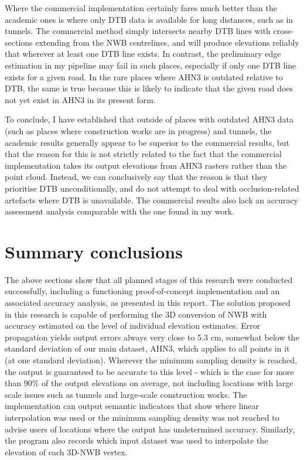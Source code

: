 Where the commercial implementation certainly fares much better than the academic ones is where only DTB data is available for long distances, such as in tunnels. The commercial method simply intersects nearby DTB lines with cross-sections extending from the NWB centrelines, and will produce elevations reliably that wherever at least one DTB line exists. In contrast, the preliminary edge estimation in my pipeline may fail in such places, especially if only one DTB line exists for a given road. In the rare places where AHN3 is outdated relative to DTB, the same is true because this is likely to indicate that the given road does not yet exist in AHN3 in its present form.

To conclude, I have established that outside of places with outdated AHN3 data (such as places where construction works are in progress) and tunnels, the academic results generally appear to be superior to the commercial results, but that the reason for this is not strictly related to the fact that the commercial implementation takes its output elevations from AHN3 rasters rather than the point cloud. Instead, we can conclusively say that the reason is that they prioritise DTB unconditionally, and do not attempt to deal with occlusion-related artefacts where DTB is unavailable. The commercial results also lack an accuracy assessment analysis comparable with the one found in my work.

\section{Summary conclusions}
\label{sec:conclusions}

The above sections show that all planned stages of this research were conducted successfully, including a functioning proof-of-concept implementation and an associated accuracy analysis, as presented in this report. The solution proposed in this research is capable of performing the 3D conversion of NWB with accuracy estimated on the level of individual elevation estimates. Error propagation yields output errors always very close to 5.3 cm, somewhat below the standard deviation of our main dataset, AHN3, which applies to all points in it (at one standard deviation). Wherever the minimum sampling density is reached, the output is guaranteed to be accurate to this level - which is the case for more than 90\% of the output elevations on average, not including locations with large scale issues such as tunnels and large-scale construction works. The implementation can output semantic indicators that show where linear interpolation was used or the minimum sampling density was not reached to advise users of locations where the output has undetermined accuracy. Similarly, the program also records which input dataset was used to interpolate the elevation of each 3D-NWB vertex.

